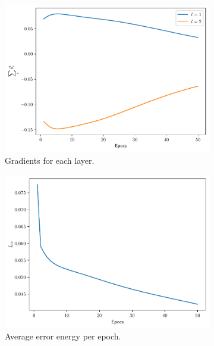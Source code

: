 \documentclass[conference]{IEEEtran}
\theoremstyle{definition}
\theoremstyle{remark}
\theoremstyle{remark}
\begin{document}
\begin{figure}
  \centering
  \begin{subfigure}[b]{0.32\textwidth}
    \centering \includegraphics[width=\textwidth]{figs/3-0.9-gradients.pdf}
    \caption{Gradients for each layer.}
  \end{subfigure}
  \begin{subfigure}[b]{0.32\textwidth}
    \centering \includegraphics[width=\textwidth]{figs/3-0.9-error.pdf}
    \caption{Average error energy per epoch.}
  \end{subfigure}
  \begin{subfigure}[b]{0.32\textwidth}

\end{subfigure}
\end{figure}
\end{document}
